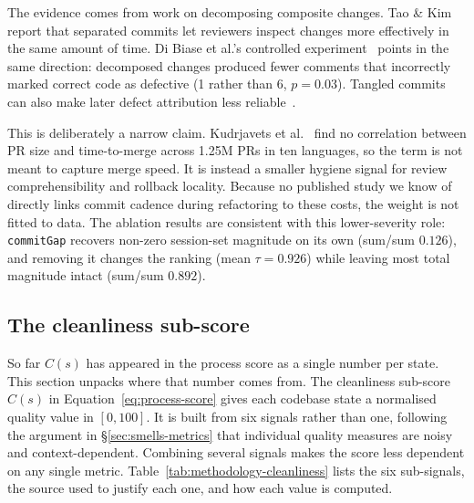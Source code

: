 The evidence comes from work on decomposing composite changes. Tao \& Kim~\cite{taokim2015partitioning} report that separated commits let reviewers inspect changes more effectively in the same amount of time. Di Biase et al.'s controlled experiment~\cite{dibiase2019decomposition} points in the same direction: decomposed changes produced fewer comments that incorrectly marked correct code as defective (1 rather than 6, $p=0.03$). Tangled commits can also make later defect attribution less reliable~\cite{herzig2013tangled}.

This is deliberately a narrow claim. Kudrjavets et al.~\cite{kudrjavets2022small} find no correlation between PR size and time-to-merge across 1.25M PRs in ten languages, so the term is not meant to capture merge speed. It is instead a smaller hygiene signal for review comprehensibility and rollback locality. Because no published study we know of directly links commit cadence during refactoring to these costs, the weight is not fitted to data. The ablation results are consistent with this lower-severity role: \texttt{commitGap} recovers non-zero session-set magnitude on its own (sum/sum $0.126$), and removing it changes the ranking (mean $\tau=0.926$) while leaving most total magnitude intact (sum/sum $0.892$).

\subsection{The cleanliness sub-score}
\label{sec:methodology-cleanliness}

So far $C(s)$ has appeared in the process score as a single number per state. This section unpacks where that number comes from. The cleanliness sub-score $C(s)$ in Equation~\eqref{eq:process-score} gives each codebase state a normalised quality value in $[0, 100]$. It is built from six signals rather than one, following the argument in \S\ref{sec:smells-metrics} that individual quality measures are noisy and context-dependent. Combining several signals makes the score less dependent on any single metric. Table~\ref{tab:methodology-cleanliness} lists the six sub-signals, the source used to justify each one, and how each value is computed.

